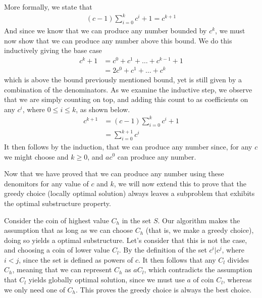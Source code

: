 \documentclass[11pt,english]{article}
\begin{document}
More formally, we state that
\begin{align}
	(c - 1)\sum_{i=0}^{k} c^i + 1 = c^{k+1}
\end{align}
And since we know that we can produce any number bounded by $c^k$, we must
now show that we can produce any number above this bound. We do this
inductively giving the base case
\begin{align}
	c^k + 1 &= c^0 + c^1 + \dots + c^{k-1} + 1\\
	&= 2c^0 + c^1 + \dots + c^k
\end{align}
%
%
%
%
which is above the bound previously mentioned bound, yet is still given by a
combination of the denominators. As we examine the inductive step, we observe
that we are simply counting on top, and adding this count to as coefficients
on any $c^i$, where $0 \leq i \leq k$, as shown below.
\begin{align}
	c^{k+1} &= (c - 1)\sum_{i=0}^{k}{c^i} + 1\\
	&= \sum_{i=0}^{k+1}{c^i} \nonumber
\end{align}
It then follows by the induction, that we can produce any number since, for
any $c$ we might choose and $k \geq 0$, and $ac^0$ can produce any number.

Now that we have proved that we can produce any number using these denomitors
for any value of $c$ and $k$, we will now extend this to prove that the greedy
choice (locally optimal solution) always leaves a subproblem that exhibits the
optimal substructure property.

Consider the coin of highest value $C_h$ in the set $S$. Our algorithm makes
the assumption that as long as we can choose $C_h$ (that is, we make a greedy
choice), doing so yields a optimal substructure. Let's consider that this is
not the case, and choosing a coin of lower value $C_l$. By the definition of
the set $c^i | c^j$, where $i < j$, since the set is defined as powers of $c$.
It then follows that any $C_l$ divides $C_h$, meaning that we can represent
$C_h$ as $aC_l$, which contradicts the assumption that $C_l$ yields globally
optimal solution, since we must use $a$ of coin $C_l$, whereas we only need
one of $C_h$. This proves the greedy choice is always the best choice.
\end{document}
